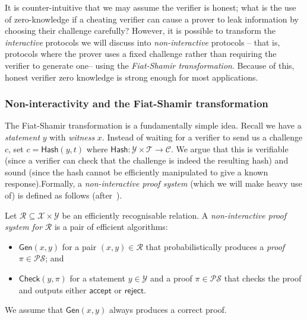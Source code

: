 \documentclass[12pt,a4paper]{article}
\theoremstyle{definition}
\begin{document}
It is counter-intuitive that we may assume the verifier is honest; what is the use of zero-knowledge if a cheating verifier can cause a prover to leak information by choosing their challenge carefully? However, it is possible to transform the \textit{interactive} protocols we will discuss into \textit{non-interactive} protocols -- that is, protocols where the prover uses a fixed challenge rather than requiring the verifier to generate one-- using the \textit{Fiat-Shamir transformation}. Because of this, honest verifier zero knowledge is strong enough for most applications.

\subsubsection{Non-interactivity and the Fiat-Shamir transformation}
The Fiat-Shamir transformation is a fundamentally simple idea. Recall we have a \textit{statement} $y$ with \textit{witness} $x$. Instead of waiting for a verifier to send us a challenge $c$, set $c = \mathsf{Hash}(y, t)$ where $\mathsf{Hash}:\mathcal{Y}\times\mathcal{T}\rightarrow\mathcal{C}$. We argue that this is verifiable (since a verifier can check that the challenge is indeed the resulting hash) and sound (since the hash cannot be efficiently manipulated to give a known response).Formally, a \textit{non-interactive proof system} (which we will make heavy use of) is defined as follows (after~\cite{boneh2020graduate}).

\begin{definition}
    Let $\mathcal{R}\subseteq\mathcal{X}\times\mathcal{Y}$ be an efficiently recognisable relation. A \textit{non-interactive proof system for} $\mathcal{R}$ is a pair of efficient algorithms:
    \begin{itemize}
        \item $\mathsf{Gen}(x, y)$ for a pair $(x, y)\in\mathcal{R}$ that probabilistically produces a \textit{proof} $\pi\in\mathcal{PS}$; and
        \item $\mathsf{Check}(y, \pi)$ for a statement $y\in\mathcal{Y}$ and a proof $\pi\in\mathcal{PS}$ that checks the proof and outputs either $\mathsf{accept}$ or $\mathsf{reject}$.
    \end{itemize}
    We assume that $\mathsf{Gen}(x, y)$ always produces a correct proof.
\end{definition}
\end{document}
